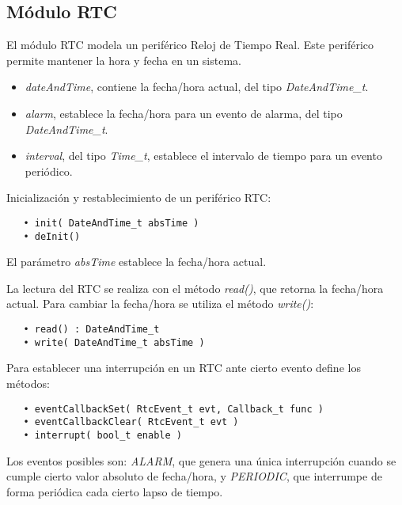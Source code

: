\subsection{Módulo RTC}

El módulo RTC modela un periférico Reloj de Tiempo Real. Este periférico permite mantener la hora y fecha en un sistema.


\begin{itemize}
\item
\emph{dateAndTime}, contiene la fecha/hora actual, del tipo \emph{DateAndTime\_t}.
\item
\emph{alarm}, establece la fecha/hora para un evento de alarma, del tipo \emph{DateAndTime\_t}.
\item
\emph{interval}, del tipo \emph{Time\_t}, establece el intervalo de tiempo para un evento periódico.
\end{itemize}

\pagebreak
{}

Inicialización y restablecimiento de un periférico RTC:

\begin{verbatim}
   • init( DateAndTime_t absTime )
   • deInit()
\end{verbatim}

El parámetro \emph{absTime} establece la fecha/hora actual. 

La lectura del RTC se realiza con el método \emph{read()}, que retorna la fecha/hora actual. Para cambiar la fecha/hora se utiliza el método \emph{write()}:

\begin{verbatim}
   • read() : DateAndTime_t
   • write( DateAndTime_t absTime )
\end{verbatim}

Para establecer una interrupción en un RTC ante cierto evento define los métodos: 

\begin{verbatim}
   • eventCallbackSet( RtcEvent_t evt, Callback_t func )
   • eventCallbackClear( RtcEvent_t evt )
   • interrupt( bool_t enable )
\end{verbatim}

Los eventos posibles son: \emph{ALARM}, que genera una única interrupción cuando se cumple cierto valor absoluto de fecha/hora, y \emph{PERIODIC}, que interrumpe de forma periódica cada cierto lapso de tiempo.
